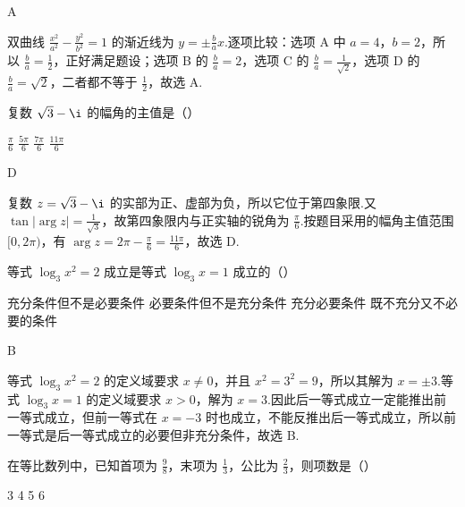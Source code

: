 \documentclass[UTF8,a4paper,oneside,11pt]{ctexbook}
\begin{document}
\begin{answer}
A
\end{answer}

\begin{solution}
双曲线 \(\frac{x^2}{a^2}-\frac{y^2}{b^2}=1\) 的渐近线为
\(y=\pm\frac{b}{a}x\).逐项比较：选项 A 中 \(a=4\)，\(b=2\)，所以 \(\frac{b}{a}=\frac{1}{2}\)，正好满足题设；选项 B 的 \(\frac{b}{a}=2\)，选项 C 的 \(\frac{b}{a}=\frac{1}{\sqrt{2}}\)，选项 D 的 \(\frac{b}{a}=\sqrt{2}\)，二者都不等于 \(\frac{1}{2}\)，故选 A.
\end{solution}

\begin{problem}

复数 \(\sqrt{3}-\i\) 的幅角的主值是（\quad）

\choices
    {\(\frac{\pi}{6}\)}
    {\(\frac{5\pi}{6}\)}
    {\(\frac{7\pi}{6}\)}
    {\(\frac{11\pi}{6}\)}
\end{problem}

\begin{answer}
D
\end{answer}

\begin{solution}
复数 \(z=\sqrt{3}-\i\) 的实部为正、虚部为负，所以它位于第四象限.又
\(\tan|\arg z|=\frac{1}{\sqrt{3}}\)，故第四象限内与正实轴的锐角为 \(\frac{\pi}{6}\).按题目采用的幅角主值范围 \([0,2\pi)\)，有
\(\arg z=2\pi-\frac{\pi}{6}=\frac{11\pi}{6}\)，故选 D.
\end{solution}

\begin{problem}

等式 \(\log_3 x^2=2\) 成立是等式 \(\log_3 x=1\) 成立的（\quad）

\choices
    {充分条件但不是必要条件}
    {必要条件但不是充分条件}
    {充分必要条件}
    {既不充分又不必要的条件}
\end{problem}

\begin{answer}
B
\end{answer}

\begin{solution}
等式 \(\log_3x^2=2\) 的定义域要求 \(x\ne0\)，并且
\(x^2=3^2=9\)，所以其解为 \(x=\pm3\).等式 \(\log_3x=1\) 的定义域要求 \(x>0\)，解为 \(x=3\).因此后一等式成立一定能推出前一等式成立，但前一等式在 \(x=-3\) 时也成立，不能反推出后一等式成立，所以前一等式是后一等式成立的必要但非充分条件，故选 B.
\end{solution}

\begin{problem}

在等比数列中，已知首项为 \(\frac{9}{8}\)，末项为 \(\frac{1}{3}\)，公比为 \(\frac{2}{3}\)，则项数是（\quad）

\choices
    {3}
    {4}
    {5}
    {6}
\end{problem}
\end{document}
